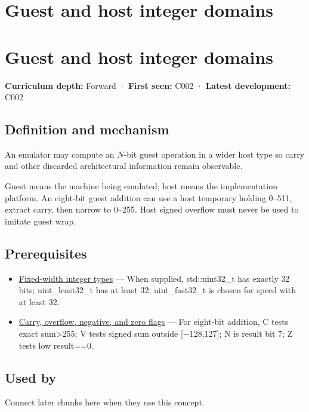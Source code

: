 \hypertarget{appendix-33e7a011b684}{}
\section*{Guest and host integer domains}
\section{Guest and host integer domains}\label{guest-and-host-integer-domains}

\textbf{Curriculum depth:} Forward · \textbf{First seen:} C002 · \textbf{Latest development:} C002

\subsection{Definition and mechanism}\label{definition-and-mechanism}

An emulator may compute an \(N\)-bit guest operation in a wider host type so carry and other discarded architectural information remain observable.

Guest means the machine being emulated; host means the implementation platform. An eight-bit guest addition can use a host temporary holding 0--511, extract carry, then narrow to 0--255. Host signed overflow must never be used to imitate guest wrap.

\subsection{Prerequisites}\label{prerequisites}

\begin{itemize}
\tightlist
\item
  \hyperref[appendix-cc04044b5782]{Fixed-width integer types} --- When supplied, std::uint32\_t has exactly 32 bits; uint\_least32\_t has at least 32; uint\_fast32\_t is chosen for speed with at least 32.
\item
  \hyperref[appendix-8d687c9c08ab]{Carry, overflow, negative, and zero flags} --- For eight-bit addition, C tests exact sum\textgreater255; V tests signed sum outside {[}−128,127{]}; N is result bit 7; Z tests low result==0.
\end{itemize}

\subsection{Used by}\label{used-by}

Connect later chunks here when they use this concept.

